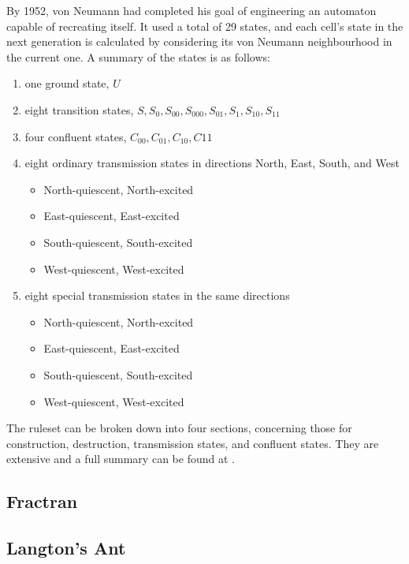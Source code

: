 \documentclass[11pt,a4paper]{article}
\begin{document}
    By 1952, von Neumann had completed his goal of engineering an automaton
    capable of recreating itself. It used a total of 29 states, and each cell's
    state in the next generation is calculated by considering its von Neumann
    neighbourhood in the current one. A summary of the states is as follows:

    \begin{enumerate}
        \item one ground state, $U$
        \item eight transition states,
            $S,S_0,S_{00},S_{000},S_{01},S_1,S_{10},S_{11}$
        \item four confluent states, $C_{00}, C_{01}, C_{10}, C{11}$
        \item eight ordinary transmission states in directions North, East,
            South, and West
            \begin{itemize}
                \item North-quiescent, North-excited
                \item East-quiescent, East-excited
                \item South-quiescent, South-excited
                \item West-quiescent, West-excited
            \end{itemize}
        \item eight special transmission states in the same directions
            \begin{itemize}
                \item North-quiescent, North-excited
                \item East-quiescent, East-excited
                \item South-quiescent, South-excited
                \item West-quiescent, West-excited
            \end{itemize}
    \end{enumerate}

    The ruleset can be broken down into four sections, concerning those for
    construction, destruction, transmission states, and confluent states. They
    are extensive and a full summary can be found at \cite{VN_rules}.

    \subsection{Fractran}
    \subsection{Langton's Ant}
\end{document}
